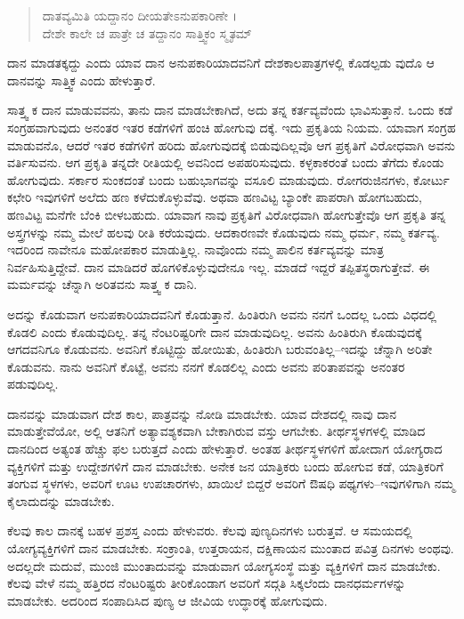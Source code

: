\begin{verse}
ದಾತವ್ಯಮಿತಿ ಯದ್ದಾನಂ ದೀಯತೇಽನುಪಕಾರಿಣೇ ।\\ದೇಶೇ ಕಾಲೇ ಚ ಪಾತ್ರೇ ಚ ತದ್ದಾನಂ ಸಾತ್ತ್ವಿಕಂ ಸ್ಮೃತಮ್ 
\end{verse}

{\small ದಾನ ಮಾಡತಕ್ಕದ್ದು ಎಂದು ಯಾವ ದಾನ ಅನುಪಕಾರಿಯಾದವನಿಗೆ ದೇಶಕಾಲಪಾತ್ರಗಳಲ್ಲಿ ಕೊಡಲ್ಪಡು ವುದೊ ಆ ದಾನವನ್ನು ಸಾತ್ತ್ವಿಕ ಎಂದು ಹೇಳುತ್ತಾರೆ.}

ಸಾತ್ತ್ವ ಕ ದಾನ ಮಾಡುವವನು, ತಾನು ದಾನ ಮಾಡಬೇಕಾಗಿದೆ, ಅದು ತನ್ನ ಕರ್ತವ್ಯವೆಂದು ಭಾವಿಸುತ್ತಾನೆ. ಒಂದು ಕಡೆ ಸಂಗ್ರಹವಾಗುವುದು ಅನಂತರ ಇತರ ಕಡೆಗಳಿಗೆ ಹಂಚಿ ಹೋಗುವು ದಕ್ಕೆ. ಇದು ಪ್ರಕೃತಿಯ ನಿಯಮ. ಯಾವಾಗ ಸಂಗ್ರಹ ಮಾಡುವನೊ, ಆದರೆ ಇತರ ಕಡೆಗಳಿಗೆ ಹರಿದು ಹೋಗುವುದಕ್ಕೆ ಬಿಡುವುದಿಲ್ಲವೊ ಆಗ ಪ್ರಕೃತಿಗೆ ವಿರೋಧವಾಗಿ ಅವನು ವರ್ತಿಸುವನು. ಆಗ ಪ್ರಕೃತಿ ತನ್ನದೇ ರೀತಿಯಲ್ಲಿ ಅವನಿಂದ ಅಪಹರಿಸುವುದು. ಕಳ್ಳಕಾಕರಂತೆ ಬಂದು ತೆಗೆದು ಕೊಂಡು ಹೋಗುವುದು. ಸರ್ಕಾರ ಸುಂಕದಂತೆ ಬಂದು ಬಹುಭಾಗವನ್ನು ವಸೂಲಿ ಮಾಡುವುದು. ರೋಗರುಜಿನಗಳು, ಕೋರ್ಟು ಕಛೇರಿ ಇವುಗಳಿಗೆ ಅಲೆದು ಹಣ ಕಳೆದುಕೊಳ್ಳುವೆವು. ಅಥವಾ ಹಣವಿಟ್ಟ ಬ್ಯಾಂಕೇ ಪಾಪರಾಗಿ ಹೋಗಬಹುದು, ಹಣವಿಟ್ಟ ಮನೆಗೇ ಬೆಂಕಿ ಬೀಳಬಹುದು. ಯಾವಾಗ ನಾವು ಪ್ರಕೃತಿಗೆ ವಿರೋಧವಾಗಿ ಹೋಗುತ್ತೇವೊ ಆಗ ಪ್ರಕೃತಿ ತನ್ನ ಅಸ್ತ್ರಗಳನ್ನು ನಮ್ಮ ಮೇಲೆ ಹಲವು ರೀತಿ ಕರೆಯವುದು. ಆದಕಾರಣವೇ ಕೊಡುವುದು ನಮ್ಮ ಧರ್ಮ, ನಮ್ಮ ಕರ್ತವ್ಯ. ಇದರಿಂದ ನಾವೇನೂ ಮಹೋಪಕಾರ ಮಾಡುತ್ತಿಲ್ಲ. ನಾವೊಂದು ನಮ್ಮ ಪಾಲಿನ ಕರ್ತವ್ಯವನ್ನು ಮಾತ್ರ ನಿರ್ವಹಿಸುತ್ತಿದ್ದೇವೆ. ದಾನ ಮಾಡಿದರೆ ಹೊಗಳಿಕೊಳ್ಳುವುದೇನೂ ಇಲ್ಲ. ಮಾಡದೆ ಇದ್ದರೆ ತಪ್ಪಿತಸ್ಥರಾಗುತ್ತೇವೆ. ಈ ಮರ್ಮವನ್ನು ಚೆನ್ನಾಗಿ ಅರಿತವನು ಸಾತ್ತ್ವ ಕ ದಾನಿ.

ಅದನ್ನು ಕೊಡುವಾಗ ಅನುಪಕಾರಿಯಾದವನಿಗೆ ಕೊಡುತ್ತಾನೆ. ಹಿಂತಿರುಗಿ ಅವನು ನನಗೆ ಒಂದಲ್ಲ ಒಂದು ವಿಧದಲ್ಲಿ ಕೊಡಲಿ ಎಂದು ಕೊಡುವುದಿಲ್ಲ. ತನ್ನ ನೆಂಟರಿಷ್ಟರಿಗೇ ದಾನ ಮಾಡುವುದಿಲ್ಲ. ಅವನು ಹಿಂತಿರುಗಿ ಕೊಡುವುದಕ್ಕೆ ಆಗದವನಿಗೂ ಕೊಡುವನು. ಅವನಿಗೆ ಕೊಟ್ಟಿದ್ದು ಹೋಯಿತು, ಹಿಂತಿರುಗಿ ಬರುವಂತಿಲ್ಲ–ಇದನ್ನು ಚೆನ್ನಾಗಿ ಅರಿತೇ ಕೊಡುವನು. ನಾನು ಅವನಿಗೆ ಕೊಟ್ಟೆ, ಅವನು ನನಗೆ ಕೊಡಲಿಲ್ಲ ಎಂದು ಅವನು ಪರಿತಾಪವನ್ನು ಅನಂತರ ಪಡುವುದಿಲ್ಲ.

ದಾನವನ್ನು ಮಾಡುವಾಗ ದೇಶ ಕಾಲ, ಪಾತ್ರವನ್ನು ನೋಡಿ ಮಾಡಬೇಕು. ಯಾವ ದೇಶದಲ್ಲಿ ನಾವು ದಾನ ಮಾಡುತ್ತೇವೆಯೋ, ಅಲ್ಲಿ ಆತನಿಗೆ ಅತ್ಯಾವಶ್ಯಕವಾಗಿ ಬೇಕಾಗಿರುವ ವಸ್ತು ಆಗಬೇಕು. ತೀರ್ಥಸ್ಥಳಗಳಲ್ಲಿ ಮಾಡಿದ ದಾನದಿಂದ ಅತ್ಯಂತ ಹೆಚ್ಚು ಫಲ ಬರುತ್ತದೆ ಎಂದು ಹೇಳುತ್ತಾರೆ. ಅಂತಹ ತೀರ್ಥಸ್ಥಳಗಳಿಗೆ ಹೋದಾಗ ಯೋಗ್ಯರಾದ ವ್ಯಕ್ತಿಗಳಿಗೆ ಮತ್ತು ಉದ್ದೇಶಗಳಿಗೆ ದಾನ ಮಾಡಬೇಕು. ಅನೇಕ ಜನ ಯಾತ್ರಿಕರು ಬಂದು ಹೋಗುವ ಕಡೆ, ಯಾತ್ರಿಕರಿಗೆ ತಂಗುವ ಸ್ಥಳಗಳು, ಅವರಿಗೆ ಊಟ ಉಪಚಾರಗಳು, ಖಾಯಿಲೆ ಬಿದ್ದರೆ ಅವರಿಗೆ ಔಷಧಿ ಪಥ್ಯಗಳು–ಇವುಗಳಿಗಾಗಿ ನಮ್ಮ ಕೈಲಾದುದನ್ನು ಮಾಡಬೇಕು.

ಕೆಲವು ಕಾಲ ದಾನಕ್ಕೆ ಬಹಳ ಪ್ರಶಸ್ತ ಎಂದು ಹೇಳುವರು. ಕೆಲವು ಪುಣ್ಯದಿನಗಳು ಬರುತ್ತವೆ. ಆ ಸಮಯದಲ್ಲಿ ಯೋಗ್ಯವ್ಯಕ್ತಿಗಳಿಗೆ ದಾನ ಮಾಡಬೇಕು. ಸಂಕ್ರಾಂತಿ, ಉತ್ತರಾಯನ, ದಕ್ಷಿಣಾಯನ ಮುಂತಾದ ಪವಿತ್ರ ದಿನಗಳು ಅಂಥವು. ಅದಲ್ಲದೇ ಮದುವೆ, ಮುಂಜಿ ಮುಂತಾದುವನ್ನು ಮಾಡುವಾಗ ಯೋಗ್ಯಸಂಸ್ಥೆ ಮತ್ತು ವ್ಯಕ್ತಿಗಳಿಗೆ ದಾನ ಮಾಡಬೇಕು. ಕೆಲವು ವೇಳೆ ನಮ್ಮ ಹತ್ತಿರದ ನೆಂಟರಿಷ್ಟರು ತೀರಿಕೊಂಡಾಗ ಅವರಿಗೆ ಸದ್ಗತಿ ಸಿಕ್ಕಲೆಂದು ದಾನಧರ್ಮಗಳನ್ನು ಮಾಡಬೇಕು. ಅದರಿಂದ ಸಂಪಾದಿಸಿದ ಪುಣ್ಯ ಆ ಜೀವಿಯ ಉದ್ಧಾರಕ್ಕೆ ಹೋಗುವುದು.

